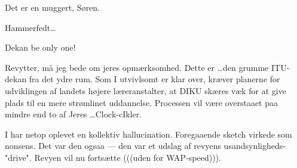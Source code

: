 \documentclass[a4paper,12pt]{article}
\begin{document}
\begin{sketch}
 Det er en muggert, Søren.

 Hammerfedt\ldots {}

 Dekan be only one!


 Revytter, må jeg bede om jeres
opmærksomhed. Dette er \ldots den grumme ITU-dekan fra det ydre rum.
Som I utvivlsomt er klar over, kræver planerne for udviklingen af
landets højere læreranstalter, at DIKU skæres væk for at give plads
til en mere strømlinet uddannelse. Processen vil være overstaaet paa
mindre end to af Jeres \ldots Clock-cIkler.


 I har netop oplevet en kollektiv hallucination. Foregaaende sketch
virkede som nonsens. Det var den ogsaa --- den var et udslag af revyens
usandsynligheds-"drive". Revyen vil nu fortsætte (((uden for
WAP-speed))).

\end{sketch}
\end{document}
